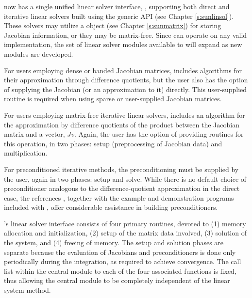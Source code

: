 {\ida} now has a single unified linear solver interface, {\idals},
supporting both direct and iterative linear solvers built using the
generic {\sunlinsol} API (see Chapter \ref{s:sunlinsol}).  These
solvers may utilize a {\sunmatrix} object (see Chapter
\ref{s:sunmatrix}) for storing Jacobian information, or they may be
matrix-free.  Since {\ida} can operate on any valid {\sunlinsol}
implementation, the set of linear solver modules available to {\ida}
will expand as new {\sunlinsol} modules are developed.

For users employing dense or banded Jacobian matrices, {\idals}
includes algorithms for their approximation through difference
quotients, but the user also has the option of supplying the Jacobian
(or an approximation to it) directly.  This user-supplied
routine is required when using sparse or user-supplied Jacobian
matrices.

For users employing matrix-free iterative linear solvers, {\idals}
includes an algorithm for the approximation by difference quotients of
the product between the Jacobian matrix and a vector, $Jv$. Again, the
user has the option of providing routines for this operation, in two
phases: setup (preprocessing of Jacobian data) and multiplication.

For preconditioned iterative methods, 
the preconditioning must be supplied by the user, again in two phases:
setup and solve.  While there is no
default choice of preconditioner analogous to the difference-quotient
approximation in the direct case, the references
\cite{BrHi:89,Byr:92}, together with the example and demonstration
programs included with {\ida}, offer considerable assistance in
building preconditioners.

{\ida}'s linear solver interface consists of four primary routines,
devoted to (1) memory allocation and initialization, (2) setup of the
matrix data involved, (3) solution of the system, and (4) freeing of memory.
The setup and solution phases are separate because the evaluation of
Jacobians and preconditioners is done only periodically during the
integration, as required to achieve convergence. The call list within
the central {\ida} module to each of the four associated functions is
fixed, thus allowing the central module to be completely independent
of the linear system method.

